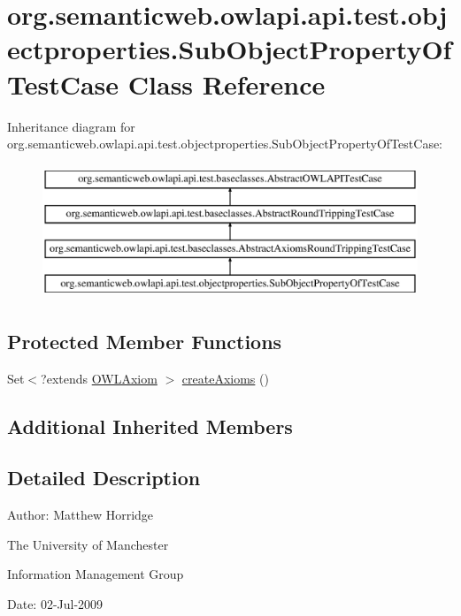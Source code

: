 \hypertarget{classorg_1_1semanticweb_1_1owlapi_1_1api_1_1test_1_1objectproperties_1_1_sub_object_property_of_test_case}{\section{org.\-semanticweb.\-owlapi.\-api.\-test.\-objectproperties.\-Sub\-Object\-Property\-Of\-Test\-Case Class Reference}
\label{classorg_1_1semanticweb_1_1owlapi_1_1api_1_1test_1_1objectproperties_1_1_sub_object_property_of_test_case}
}
Inheritance diagram for org.\-semanticweb.\-owlapi.\-api.\-test.\-objectproperties.\-Sub\-Object\-Property\-Of\-Test\-Case\-:\begin{figure}[H]
\begin{center}
\leavevmode
\includegraphics[height=4.000000cm]{classorg_1_1semanticweb_1_1owlapi_1_1api_1_1test_1_1objectproperties_1_1_sub_object_property_of_test_case}
\end{center}
\end{figure}
\subsection*{Protected Member Functions}
\begin{DoxyCompactItemize}
\item 
Set$<$?extends \hyperlink{interfaceorg_1_1semanticweb_1_1owlapi_1_1model_1_1_o_w_l_axiom}{O\-W\-L\-Axiom} $>$ \hyperlink{classorg_1_1semanticweb_1_1owlapi_1_1api_1_1test_1_1objectproperties_1_1_sub_object_property_of_test_case_abcc09ef18c0df10a13c62d73dbbef491}{create\-Axioms} ()
\end{DoxyCompactItemize}
\subsection*{Additional Inherited Members}


\subsection{Detailed Description}
Author\-: Matthew Horridge\par
 The University of Manchester\par
 Information Management Group\par
 Date\-: 02-\/\-Jul-\/2009 

